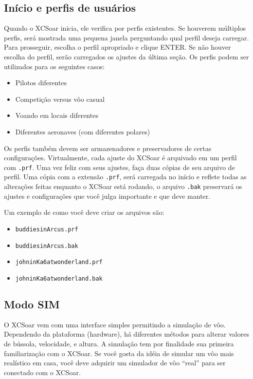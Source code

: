\subsection*{Início e perfis de usuários}\label{sec:profiles}
Quando o XCSoar inicia, ele verifica por perfis existentes.  Se houverem múltiplos perfis, será mostrada uma pequena janela perguntando qual perfil deseja carregar.  Para prosseguir, escolha o perfil apropriado e clique ENTER.  Se não houver escolha do perfil, serão carregados os ajustes da última seção.  Os perfis podem ser utilizados para os seguintes casos:
\begin{itemize}
\item Pilotos diferentes
\item Competição versus vôo casual
\item Voando em locais diferentes
\item Diferentes aeronaves (com diferentes polares)
\end{itemize}
Os perfis também devem ser armazenadores e preservadores de certas configurações.  Virtualmente, cada ajuste do XCSoar é arquivado em um perfil com \texttt{.prf}. Uma vez feliz com seus ajustes, faça duas cópias de seu arquivo de perfil.  Uma cópia com a extensão \texttt{.prf}, será carregada no início e reflete todas as alterações feitas enquanto o XCSoar está rodando, o arquivo \texttt{.bak} preservará os ajustes e configurações que você julga importante e que deve manter.

Um exemplo de como você deve criar os arquivos são:
\begin{itemize}
\item \texttt{buddiesinArcus.prf}
\item \texttt{buddiesinArcus.bak}
\item \texttt{johninKa6atwonderland.prf}
\item \texttt{johninKa6atwonderland.bak}
\end{itemize}

\subsection*{Modo SIM}
O XCSoar vem com uma interface simples permitindo a simulação de vôo.  Dependendo da plataforma (hardware), há diferentes métodos para alterar valores de bússola, velocidade, e altura.  A simulação tem por finalidade sua primeira familiarização com o XCSoar.  Se você gosta da idéia de simular um vôo mais realístico em casa, você deve adquirir um simulador de vôo “real” para ser conectado com o XCSoar.

